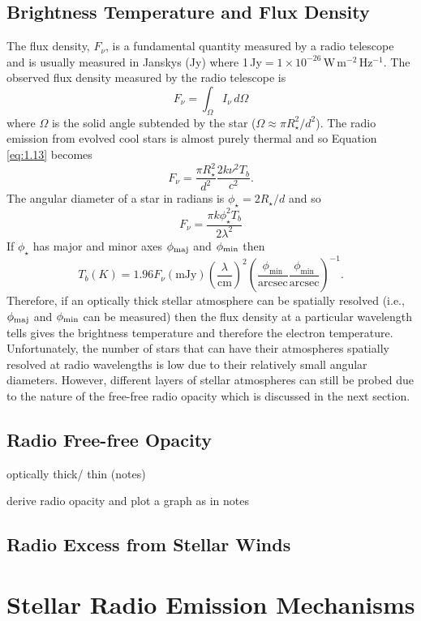 \subsection{Brightness Temperature and Flux Density}\label{subsec:3.1.2}
The flux density, $F_{\nu}$, is a fundamental quantity measured by a radio telescope and is usually measured in Janskys (Jy) where 1\,Jy$ = 1\times 10^{-26}$\,W\,m$^{-2}$\,Hz$^{-1}$. The observed flux density measured by the radio telescope is
\begin{equation}\label{eq:1.13}
F_{\nu} = \int _{\Omega} I_{\nu}\,d\Omega
\end{equation}
where $\Omega$ is the solid angle subtended by the star ($\Omega \approx \pi R_{\star}^2/d^2$). The radio emission from evolved cool stars is almost purely thermal and so Equation \ref{eq:1.13} becomes 
\begin{equation}
F_{\nu} =  \frac{\pi R_{\star}^2}{d^2}\frac{2k\nu ^2T_{b}}{c^2}.
\end{equation}
The angular diameter of a star in radians is $\phi _{\star}=2R_{\star}/d$ and so
\begin{equation}
F_{\nu}=\frac{\pi k\phi _{\star}^2 T_b}{2\lambda ^2}
\end{equation}
If $\phi _{\star}$ has major and minor axes $\phi _{\rm{maj}}$ and $\phi _{\rm{min}}$ then
\begin{equation}
T_{b} (K)=1.96F_{\nu}(\mathrm{mJy})\left(\frac{\lambda}{\mathrm{cm}}\right)^2\left(\frac{\phi _{\mathrm{min}}}{\mathrm{arcsec}} \frac{\phi _{\mathrm{min}}}{\mathrm{arcsec}}\right)^{-1}.
\end{equation}
Therefore, if an optically thick stellar atmosphere can be spatially resolved (i.e., $\phi _{\rm{maj}}$ and $\phi _{\rm{min}}$ can be measured) then the flux density at a particular wavelength tells gives the brightness temperature and therefore the electron temperature. Unfortunately, the number of stars that can have their atmospheres spatially resolved at radio wavelengths is low due to their relatively small angular diameters. However, different layers of stellar atmospheres can still be probed due to the nature of the free-free radio opacity which is discussed in the next section.

\subsection{Radio Free-free Opacity}\label{subsec:3.1.2}
optically thick/ thin (notes)

derive radio opacity and plot a graph as in notes

\subsection{Radio Excess from Stellar Winds}\label{subsec:3.1.3}


\section{Stellar Radio Emission Mechanisms}\label{sec:3.1.4}



